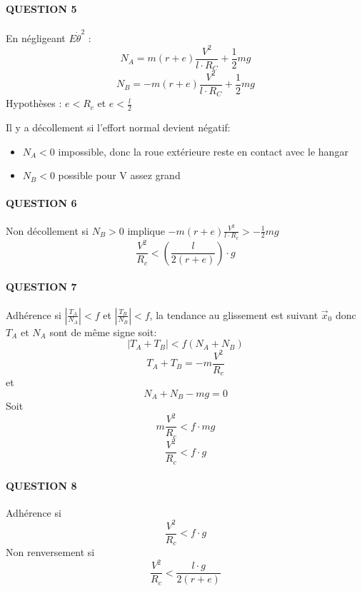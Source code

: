 \paragraph{QUESTION 5}
En négligeant $E\dot\theta^2$ :
\begin{equation}
	N_A = m(r+e)\frac{V^2}{l\cdot R_C} + \frac{1}{2}mg
\end{equation}
\begin{equation}
	N_B = -m(r+e)\frac{V^2}{l\cdot R_C} + \frac{1}{2}mg
\end{equation}
Hypothèses : $e<R_c$ et $e<\frac{l}{2}$

Il y a décollement si l'effort normal devient négatif:
\begin{itemize}
	\item $N_A<0$ impossible, donc la roue extérieure reste en contact avec le hangar
	\item $N_B<0$ possible pour V assez grand
\end{itemize}
\paragraph{QUESTION 6}
Non décollement si $N_B>0$ implique $-m(r+e)\frac{V^2}{l\cdot R_c} > -\frac{1}{2}mg$
\begin{equation}
	\frac{V^2}{R_c} < \left( \frac{l}{2(r+e)} \right) \cdot g
\end{equation}
\paragraph{QUESTION 7}
Adhérence si $\left| \frac{T_A}{N_A} \right| < f$ et $\left| \frac{T_B}{N_B} \right | < f$, la tendance au glissement est suivant $\vec x_0$ donc $T_A$ et $N_A$ sont de même signe soit:
\[ |T_A + T_B| < f(N_A + N_B) \]
\[ T_A + T_B = -m \frac{V^2}{R_c} \]
et \[N_A + N_B - mg = 0\]
Soit \[ m \frac{V^2}{R_c} < f \cdot mg \]
\begin{equation}
	\frac{V^2}{R_c} < f\cdot g
\end{equation}
\paragraph{QUESTION 8}
Adhérence si
\begin{equation}
	\frac{V^2}{R_c} < f\cdot g
\end{equation}
Non renversement si
\begin{equation}
	\frac{V^2}{R_c} < \frac{l\cdot g}{2(r+e)}
\end{equation}

